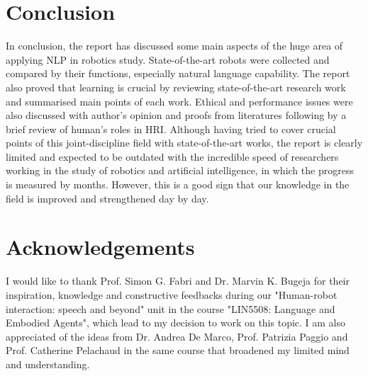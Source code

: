 \documentclass[10pt, a4paper]{article}
\begin{document}
\section{Conclusion}

In conclusion, the report has discussed some main aspects of the huge area of applying NLP in robotics study. State-of-the-art robots were collected and compared by their functions, especially natural language capability. The report also proved that learning is crucial by reviewing state-of-the-art research work and summarised main points of each work.  Ethical and performance issues were also discussed with author's opinion and proofs from literatures following by a brief review of human's roles in HRI. Although having tried to cover crucial points of this joint-discipline field with state-of-the-art works, the report is clearly limited and expected to be outdated with the incredible speed of researchers working in the study of robotics and artificial intelligence, in which the progress is measured by months. However, this is a good sign that our knowledge in the field is improved and strengthened day by day.


\section{Acknowledgements}

I would like to thank Prof. Simon G. Fabri and Dr. Marvin K. Bugeja for their inspiration, knowledge and constructive feedbacks during our "Human-robot interaction: speech and beyond" unit in the course "LIN5508: Language and Embodied Agents", which lead to my decision to work on this topic. I am also appreciated of the ideas from Dr. Andrea De Marco, Prof. Patrizia Paggio and Prof. Catherine Pelachaud in the same course that broadened my limited mind and understanding.




\end{document}
